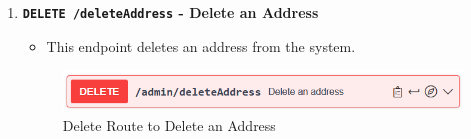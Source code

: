 \begin{enumerate}
        \item \textbf{\texttt{DELETE /deleteAddress} - Delete an Address}
        \begin{itemize}
            \item This endpoint deletes an address from the system.
        \end{itemize} 
        \begin{figure} [H]
            \centering
            \includegraphics [width=1\textwidth] {images/andreas/praxis/deleteAddress.png}
            \caption{Delete Route to Delete an Address}
        \end{figure}
    \end{enumerate}